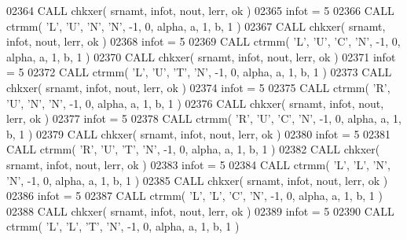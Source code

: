 \begin{DoxyCode}
02364       \textcolor{keyword}{CALL }chkxer( srnamt, infot, nout, lerr, ok )
02365       infot = 5
02366       \textcolor{keyword}{CALL }ctrmm( \textcolor{stringliteral}{'L'}, \textcolor{stringliteral}{'U'}, \textcolor{stringliteral}{'N'}, \textcolor{stringliteral}{'N'}, -1, 0, alpha, a, 1, b, 1 )
02367       \textcolor{keyword}{CALL }chkxer( srnamt, infot, nout, lerr, ok )
02368       infot = 5
02369       \textcolor{keyword}{CALL }ctrmm( \textcolor{stringliteral}{'L'}, \textcolor{stringliteral}{'U'}, \textcolor{stringliteral}{'C'}, \textcolor{stringliteral}{'N'}, -1, 0, alpha, a, 1, b, 1 )
02370       \textcolor{keyword}{CALL }chkxer( srnamt, infot, nout, lerr, ok )
02371       infot = 5
02372       \textcolor{keyword}{CALL }ctrmm( \textcolor{stringliteral}{'L'}, \textcolor{stringliteral}{'U'}, \textcolor{stringliteral}{'T'}, \textcolor{stringliteral}{'N'}, -1, 0, alpha, a, 1, b, 1 )
02373       \textcolor{keyword}{CALL }chkxer( srnamt, infot, nout, lerr, ok )
02374       infot = 5
02375       \textcolor{keyword}{CALL }ctrmm( \textcolor{stringliteral}{'R'}, \textcolor{stringliteral}{'U'}, \textcolor{stringliteral}{'N'}, \textcolor{stringliteral}{'N'}, -1, 0, alpha, a, 1, b, 1 )
02376       \textcolor{keyword}{CALL }chkxer( srnamt, infot, nout, lerr, ok )
02377       infot = 5
02378       \textcolor{keyword}{CALL }ctrmm( \textcolor{stringliteral}{'R'}, \textcolor{stringliteral}{'U'}, \textcolor{stringliteral}{'C'}, \textcolor{stringliteral}{'N'}, -1, 0, alpha, a, 1, b, 1 )
02379       \textcolor{keyword}{CALL }chkxer( srnamt, infot, nout, lerr, ok )
02380       infot = 5
02381       \textcolor{keyword}{CALL }ctrmm( \textcolor{stringliteral}{'R'}, \textcolor{stringliteral}{'U'}, \textcolor{stringliteral}{'T'}, \textcolor{stringliteral}{'N'}, -1, 0, alpha, a, 1, b, 1 )
02382       \textcolor{keyword}{CALL }chkxer( srnamt, infot, nout, lerr, ok )
02383       infot = 5
02384       \textcolor{keyword}{CALL }ctrmm( \textcolor{stringliteral}{'L'}, \textcolor{stringliteral}{'L'}, \textcolor{stringliteral}{'N'}, \textcolor{stringliteral}{'N'}, -1, 0, alpha, a, 1, b, 1 )
02385       \textcolor{keyword}{CALL }chkxer( srnamt, infot, nout, lerr, ok )
02386       infot = 5
02387       \textcolor{keyword}{CALL }ctrmm( \textcolor{stringliteral}{'L'}, \textcolor{stringliteral}{'L'}, \textcolor{stringliteral}{'C'}, \textcolor{stringliteral}{'N'}, -1, 0, alpha, a, 1, b, 1 )
02388       \textcolor{keyword}{CALL }chkxer( srnamt, infot, nout, lerr, ok )
02389       infot = 5
02390       \textcolor{keyword}{CALL }ctrmm( \textcolor{stringliteral}{'L'}, \textcolor{stringliteral}{'L'}, \textcolor{stringliteral}{'T'}, \textcolor{stringliteral}{'N'}, -1, 0, alpha, a, 1, b, 1 )

\end{DoxyCode}
